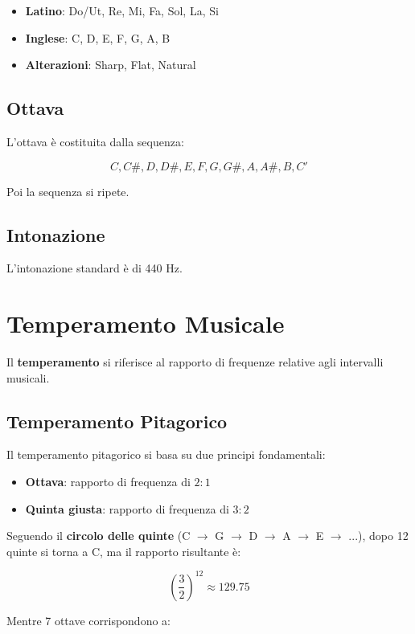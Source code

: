 \begin{itemize}
    \item \textbf{Latino}: Do/Ut, Re, Mi, Fa, Sol, La, Si
    \item \textbf{Inglese}: C, D, E, F, G, A, B
    \item \textbf{Alterazioni}: Sharp, Flat, Natural
\end{itemize}

\subsection*{Ottava}

L'ottava è costituita dalla sequenza:

\[
C, C\#, D, D\#, E, F, G, G\#, A, A\#, B, C'
\]

Poi la sequenza si ripete.

\subsection*{Intonazione}

L'intonazione standard è di 440 Hz.

\section{Temperamento Musicale}

Il \textbf{temperamento} si riferisce al rapporto di frequenze relative agli intervalli musicali.

\subsection*{Temperamento Pitagorico}

Il temperamento pitagorico si basa su due principi fondamentali:

\begin{itemize}
    \item \textbf{Ottava}: rapporto di frequenza di \( 2:1 \)
    \item \textbf{Quinta giusta}: rapporto di frequenza di \( 3:2 \)
\end{itemize}

Seguendo il \textbf{circolo delle quinte} (C $\rightarrow$ G $\rightarrow$ D $\rightarrow$ A $\rightarrow$ E $\rightarrow$ ...), dopo 12 quinte si torna a C, ma il rapporto risultante è:

\[
\left(\frac{3}{2}\right)^{12} \approx 129.75
\]

Mentre 7 ottave corrispondono a:


